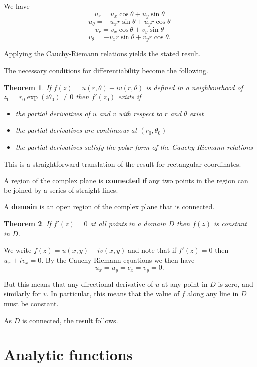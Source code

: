 \documentclass[a4paper,10pt]{article}
\newtheorem{theorem}{Theorem}[section]
\newenvironment{definition}[1][Definition]{\begin{trivlist}
\item[\hskip \labelsep {\bfseries #1}]}{\end{trivlist}}
\begin{document}
We have
$$u_r = u_x\cos\theta + u_y\sin\theta$$
$$u_\theta = -u_x r\sin\theta + u_y r\cos\theta$$
$$v_r = v_x\cos\theta + v_y\sin\theta$$
$$v_\theta = -v_x r\sin\theta + v_y r\cos\theta.$$

Applying the Cauchy-Riemann relations yields the stated result.

The necessary conditions for differentiability become the following.

\begin{theorem}
If $f(z) = u(r, \theta) + iv(r, \theta)$ is defined in a neighbourhood of $z_0 = r_0\exp(i\theta_0) \neq 0$ then $f'(z_0)$ exists if
\begin{itemize}
\item the partial derivatives of $u$ and $v$ with respect to $r$ and $\theta$ exist
\item the partial derivatives are continuous at $(r_0, \theta_0)$
\item the partial derivatives satisfy the polar form of the Cauchy-Riemann relations
\end{itemize}
\end{theorem}

This is a straightforward translation of the result for rectangular coordinates.

\begin{definition}
A region of the complex plane is \textbf{connected} if any two points in the region can be joined by a series of straight lines.
\end{definition}

\begin{definition}
A \textbf{domain} is an open region of the complex plane that is connected.
\end{definition}

\begin{theorem}
If $f'(z) = 0$ at all points in a domain $D$ then $f(z)$ is constant in $D$.
\end{theorem}

We write $f(z) = u(x, y) + iv(x, y)$ and note that if $f'(z) = 0$ then $u_x + iv_x = 0$. By the Cauchy-Riemann equations we then have
$$u_x = u_y = v_x = v_y = 0.$$

But this means that any directional derivative of $u$ at any point in $D$ is zero, and similarly for $v$. In particular, this means that the value of $f$ along any line in $D$ must be constant.

As $D$ is connected, the result follows.

\section{Analytic functions}
\end{document}
